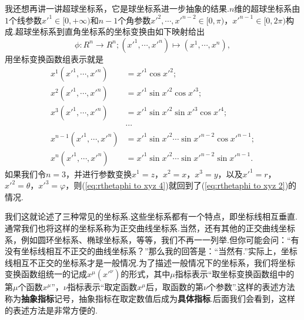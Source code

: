 		我还想再讲一讲超球坐标系，它是球坐标系进一步抽象的结果.$n$维的超球坐标系由$1$个线参数$x'^1\in[0,+\infty)$和$n-1$个角参数$x'^2,\cdots,x'^{n-2}\in[0,\pi)$，$x'^{n-1}\in[0,2\pi)$构成.超球坐标系到直角坐标系的坐标变换由如下映射给出
		\begin{equation}\label{eq:rthetaphi to xyz 3}
			\phi:R^n\rightarrow R^n;(x'^1,\cdots,x'^n)\mapsto(x^1,\cdots,x^n),
		\end{equation}
		用坐标变换函数组表示就是
		\begin{equation}\label{eq:rthetaphi to xyz 4}
			\begin{split}
				x^1(x'^1,\cdots,x'^n)&=x'^1\cos x'^2;\\
				x^2(x'^1,\cdots,x'^n)&=x'^1\sin x'^2\cos x'^3;\\
				x^3(x'^1,\cdots,x'^n)&=x'^1\sin x'^2\sin x'^3\cos x'^4;\\
				&\cdots\\
				x^{n-1}(x'^1,\cdots,x'^n)&=x'^1\sin x'^2\cdots \sin x'^{n-2}\cos x'^{n-1};\\
				x^{n}(x'^1,\cdots,x'^n)&=x'^1\sin x'^2\cdots \sin x'^{n-2}\sin x'^{n-1}.
			\end{split}
		\end{equation}
		如果我们令$n=3$，并进行参数变换$x^1=z$，$x^2=x$，$x^3=y$，以及$x'^1=r$，$x'^2=\theta$，$x'^3=\varphi$，则(\ref{eq:rthetaphi to xyz 4})就回到了(\ref{eq:rthetaphi to xyz 2})的情况.

		我们这就论述了三种常见的坐标系.这些坐标系都有一个特点，即坐标线相互垂直.通常我们也将这样的坐标系称为正交曲线坐标系.当然，还有其他的正交曲线坐标系，例如圆环坐标系、椭球坐标系，等等，我们不再一一列举.但你可能会问：“有没有坐标线相互不正交的曲线坐标系？”那么我的回答是：“当然有.”实际上，坐标线相互不正交的坐标系才是一般情况.为了描述一般情况下的坐标系，我们将坐标变换函数组统一的记成$x^\mu(x'^\nu)$的形式，其中$\mu$指标表示“取坐标变换函数组中的第$\mu$个函数$x^\mu$”，$\nu$指标表示“取定函数$x^\mu$后，取函数的第$\nu$个参数”.这样的表述方法称为\textbf{抽象指标}记号，抽象指标在取定数值后成为\textbf{具体指标}.后面我们会看到，这样的表述方法是非常方便的.